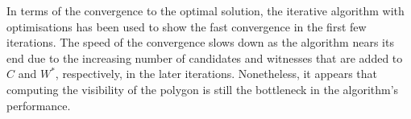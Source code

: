 In terms of the convergence to the optimal solution, the iterative algorithm with optimisations has been used to show the fast convergence in the first few iterations. The speed of the convergence slows down as the algorithm nears its end due to the increasing number of candidates and witnesses that are added to $C$ and $W^*$, respectively, in the later iterations. Nonetheless, it appears that computing the visibility of the polygon is still the bottleneck in the algorithm's performance.



